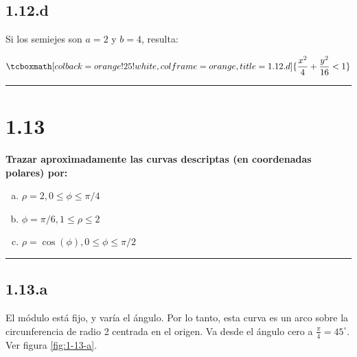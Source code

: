 \documentclass{article}
\begin{document}
\subsection*{1.12.d}
\label{subsec:1.12.d}

Si los semiejes son $a=2$ y $b=4$, resulta:

\begin{equation}
\tcboxmath[colback=orange!25!white,colframe=orange,title=1.12.d]
{ \frac{x^2}{4} + \frac{y^2}{16} < 1 }
\end{equation}

\hrule
\vspace{10 pt}

\section*{1.13}
\label{sec:1.13}

\textbf{Trazar aproximadamente las curvas descriptas (en coordenadas polares) por:}

\begin{enumerate}[(a)]
\bfseries
\item $\rho = 2, 0 \leq \phi \leq \pi/4$

\item $\phi = \pi/6, 1 \leq \rho \leq 2$

\item $\rho = \cos(\phi), 0 \leq \phi \leq \pi/2$
\end{enumerate}
\hrule

\subsection*{1.13.a}
\label{subsec:1.13.a}

El módulo está fijo, y varía el ángulo. Por lo tanto, esta curva es un arco sobre la circunferencia de radio 2 centrada en el origen. Va desde el ángulo cero a $\frac{\pi}{4} = 45^{\circ}$. Ver figura \ref{fig:1-13-a}.
\end{document}
